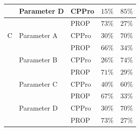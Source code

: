 \documentclass[10pt,final,journal,a4paper]{IEEEtran}
\begin{document}
\begin{table}[!t]
\begin{tabular}{|l|l|l|c|c|}
& Parameter D & CPPro & $15\%$ & $85\%$  \\%
\hline
 & & PROP & $73\%$ & $27\%$ \\%
\hline

C & Parameter A & CPPro &  $30\%$ & $70\%$ \\%
\hline
 &  & PROP & $66\%$ & $34\%$ \\ %
\hline

& Parameter B & CPPro & $26\%$ & $74\%$ \\ %
\hline
& & PROP & $71\%$ & $29\%$ \\%
\hline
& Parameter C & CPPro & $40\%$ & $60\%$  \\%
\hline
 & & PROP & $67\%$ & $33\%$ \\%
\hline

& Parameter D & CPPro & $30\%$ & $70\%$  \\%
\hline
 & & PROP & $73\%$ & $27\%$ \\%
\hline

\end{tabular}
\end{table}
\end{document}
